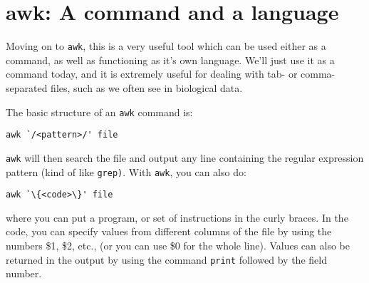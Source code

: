 \section{awk: A command and a language}
Moving on to \texttt{awk}, this is a very useful tool which can be used either as a command, as well as functioning as it's own language.
We'll just use it as a command today, and it is extremely useful for dealing with tab- or comma-separated files, such as we often see in biological data.\\
\begin{information}
The basic structure of an \texttt{awk} command is: 
\begin{lstlisting}[style=command_syntax]
awk `/<pattern>/' file
\end{lstlisting}
\texttt{awk} will then search the file and output any line containing the regular expression pattern (kind of like \texttt{grep)}.
With \texttt{awk}, you can also do: 
\begin{lstlisting}[style=command_syntax]
awk `\{<code>\}' file
\end{lstlisting}
where you can put a program, or set of instructions in the curly braces. 
In the code, you can specify values from different columns of the file by using the numbers \$1, \$2, etc., (or you can use \$0 for the whole line).
Values can also be returned in the output by using the command \texttt{print} followed by the field number.
\end{information}

